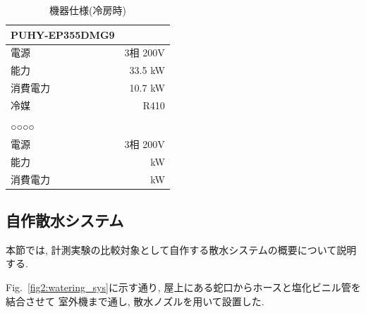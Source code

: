 \documentclass[a4j,fleqn,dvipdfmx,uplatex]{jsarticle}
\newcommand{\figref}[1]{Fig.\ \ref{#1}}
\begin{document}
\begin{table}[hhtb]
  \caption{機器仕様(冷房時)}
  \label{table:hard}
  \centering
  \begin{tabular}{lr}
    PUHY-EP355DMG9 & \\
    \hline \hline
    電源 & 3相 200V \\
    能力 & 33.5 kW \\
    消費電力 & 10.7 kW \\
    冷媒 & R410 \\
     & \\
    ○○○○ & \\
    \hline \hline
    電源 & 3相 200V \\
    能力 &  kW \\
    消費電力 &  kW \\
    \hline
  \end{tabular}
\end{table}


\subsection{自作散水システム}
本節では, 計測実験の比較対象として自作する散水システムの概要について説明する. 

\figref{fig2:watering_sys}に示す通り, 屋上にある蛇口からホースと塩化ビニル管を結合させて
室外機まで通し, 散水ノズルを用いて設置した. 
\end{document}
